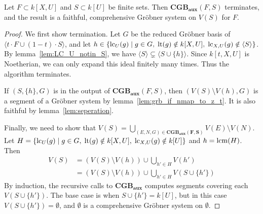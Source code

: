 \begin{algorithm}
  \caption{$\mathbf{CGB_{aux}}$}
\end{algorithm}
\begin{theorem}\label{thm:CGB_aux}
  Let $F \subset k[X, U]$ and $S \subset k[U]$ be finite sets. %
  Then $\mathbf{CGB_{aux}}(F, S)$ terminates, and the result is a faithful, comprehensive Gröbner system on $V(S)$ for $F$.
\end{theorem}
\begin{proof}
  We first show termination. Let $G$ be the reduced Gröbner basis of $\langle t\cdot F \cup (1-t)\cdot S\rangle$, and let $h \in \{\operatorname{lc}_{U}(g) \mid g \in G,\; \operatorname{lt}(g) \notin k[X, U],\; \operatorname{lc}_{X, U}(g) \notin \langle S \rangle\}$. By lemma~\ref{lem:LC_U_notin_S}, we have $\langle S \rangle \subsetneq \langle S \cup \{h\} \rangle$. Since $k[t, X, U]$ is Noetherian, we can only expand this ideal finitely many times. Thus the algorithm terminates.


  If $(S, \{h\}, G)$ is in the output of $\mathbf{CGB_{aux}}(F, S)$, then $(V(S) \setminus V(h), G)$ is a segment of a Gröbner system by lemma~\ref{lem:grb_if_nmap_to_z_t}. It is also faithful by lemma~\ref{lem:seperation}.

  Finally, we need to show that $V(S) = \bigcup_{(E, N, G) \in \mathbf{CGB_{aux}(F, S)}} V(E) \setminus V(N)$. Let $H = \{\operatorname{lc}_{U}(g) \mid g \in G,\; \operatorname{lt}(g) \notin k[X, U],\; \operatorname{lc}_{X, U}(g) \notin k[U] \}$ and $h = \operatorname{lcm}(H)$. Then
  \begin{align*}
    V(S) &= (V(S) \setminus V(h)) \cup \bigcup_{h' \in H} V(h') \\
    &= (V(S) \setminus V(h)) \cup \bigcup_{h' \in H} V(S \cup \{h'\})
  \end{align*}
  By induction, the recursive calls to $\mathbf{CGB_{aux}}$ computes segments covering each $V(S \cup \{h'\})$. The base case is when $S \cup \{h'\} = k[U]$, but in this case $V(S \cup \{h'\}) = \emptyset$, and $\emptyset$ is a comprehensive Gröbner system on $\emptyset$.
\end{proof}

